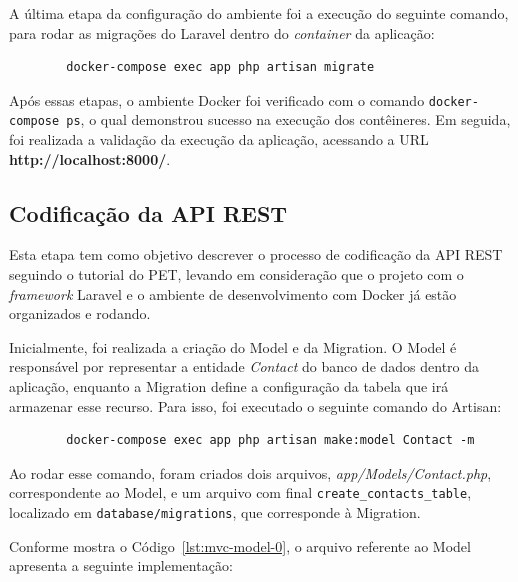         \par A última etapa da configuração do ambiente foi a execução do seguinte comando, para rodar as migrações do Laravel dentro do \textit{container} da aplicação:
        
        \begin{verbatim}
        docker-compose exec app php artisan migrate
        \end{verbatim}
        
        \sloppy
        \par Após essas etapas, o ambiente Docker foi verificado com o comando \texttt{docker-compose ps}, o qual demonstrou sucesso na execução dos contêineres. Em seguida, foi realizada a validação da execução da aplicação, acessando a URL \textbf{http://localhost:8000/}.
        
    \subsection{Codificação da API REST}
    
        \par Esta etapa tem como objetivo descrever o processo de codificação da API REST seguindo o tutorial do PET, levando em consideração que o projeto com o \textit{framework} Laravel e o ambiente de desenvolvimento com Docker já estão organizados e rodando.
        
        \par Inicialmente, foi realizada a criação do Model e da Migration. O Model é responsável por representar a entidade \textit{Contact} do banco de dados dentro da aplicação, enquanto a Migration define a configuração da tabela que irá armazenar esse recurso. Para isso, foi executado o seguinte comando do Artisan:

        \begin{verbatim}
        docker-compose exec app php artisan make:model Contact -m
        \end{verbatim}
        
        \par Ao rodar esse comando, foram criados dois arquivos, \textit{app/Models/Contact.php}, correspondente ao Model, e um arquivo com final \texttt{create\_contacts\_table}, localizado em \texttt{database/migrations}, que corresponde à Migration. 

        \par Conforme mostra o Código~\ref{lst:mvc-model-0}, o arquivo referente ao Model apresenta a seguinte implementação:

